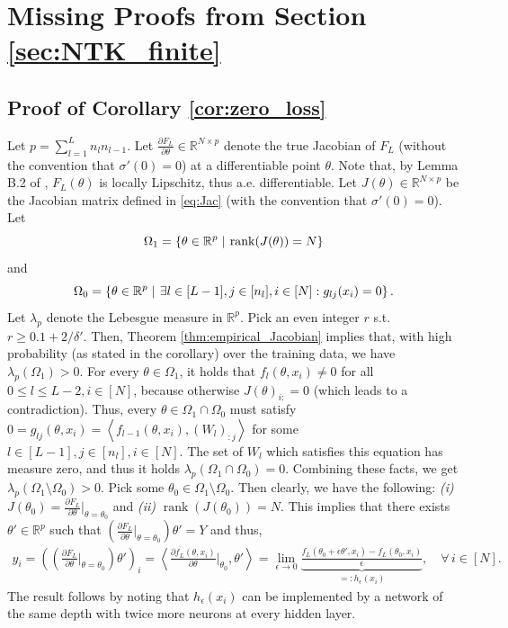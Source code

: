 \documentclass[11pt]{article}
\makeatletter
\def\RR{\mathbb{R}}
\def\rank{\operatorname{\mathop{rank}}}
\def\Set#1{\left\{ #1 \right\}}
\def\Bigbar#1{\mathrel{\left|\vphantom{#1}\right.}}%
\def\Setbar#1#2{\Set{#1 \Bigbar{#1 #2} #2}}
\newenvironment{proof}{\par\noindent{\bf Proof:\ }}{\hfill$\Box$\\[2mm]}
\newcommand{\inner}[1]{\left\langle#1\right\rangle}
\makeatother
\begin{document}
\section{Missing Proofs from Section \ref{sec:NTK_finite}}
\subsection{Proof of Corollary \ref{cor:zero_loss}}\label{app:zero_loss}
    Let $p=\sum_{l=1}^{L}n_ln_{l-1}$.
    Let $\frac{\partial F_L}{\partial\theta}\in\RR^{N\times p}$ denote the true Jacobian of $F_L$ (without the convention that $\sigma'(0)=0$) at a differentiable point $\theta.$
    Note that, by Lemma B.2 of \citep{QuynhMarco2020}, $F_L(\theta)$ is locally Lipschitz, thus a.e. differentiable.
    Let $J(\theta)\in\RR^{N\times p}$ be the Jacobian matrix defined in \eqref{eq:Jac} (with the convention that $\sigma'(0)=0$).
    Let $$\Omega_1=\Setbar{\theta\in\RR^p}{\rank(J(\theta))=N}$$ and $$\Omega_0=\Setbar{\theta\in\RR^p}{\exists l\in[L-1],j\in[n_l],i\in[N]: g_{lj}(x_i)=0} .$$ 
    Let $\lambda_p$ denote the Lebesgue measure in $\RR^p.$
    Pick an even integer $r$ s.t. $r\ge 0.1+2/\delta'$. Then, Theorem \ref{thm:empirical_Jacobian} implies that,
    with high probability (as stated in the corollary) over the training data, we have $\lambda_p(\Omega_1)>0.$ 
    For every $\theta\in\Omega_1$, it holds that $f_l(\theta,x_i)\neq 0$ for all $0\leq l\leq L-2,i\in[N]$,
    because otherwise $J(\theta)_{i:}=0$ (which leads to a contradiction).
    Thus, every $\theta\in\Omega_1\cap\Omega_0$ must satisfy $0=g_{lj}(\theta,x_i)=\inner{f_{l-1}(\theta,x_i), (W_l)_{:j}}$
    for some $l\in[L-1],j\in[n_l],i\in[N].$ 
    The set of $W_l$ which satisfies this equation has measure zero,
    and thus it holds $\lambda_p(\Omega_1\cap\Omega_0)=0.$
    Combining these facts, we get $\lambda_p(\Omega_1\setminus\Omega_0)>0.$
    Pick some $\theta_0\in\Omega_1\setminus\Omega_0.$
    Then clearly, we have the following:
    \emph{(i)} $J(\theta_0)=\frac{\partial F_L}{\partial\theta}\Big\vert_{\theta=\theta_0}$
    and \emph{(ii)} $\rank(J(\theta_0))=N.$ 
    This implies that there exists $\theta'\in\RR^p$ such that $\left(\frac{\partial F_L}{\partial\theta}\Big\vert_{\theta=\theta_0}\right)\theta'=Y$
    and thus,
    \begin{align*}
	y_i=
	\left(\left(\frac{\partial F_L}{\partial\theta}\Big\vert_{\theta=\theta_0}\right)\theta'\right)_{i}
	=\inner{\frac{\partial f_L(\theta,x_i)}{\partial\theta}\Big\vert_{\theta_0}, \theta'}
	=\lim_{\epsilon\to 0} \underbrace{\frac{f_L(\theta_0+\epsilon\theta',x_i)-f_L(\theta_0,x_i)}{\epsilon}}_{=:h_\epsilon(x_i)},\quad\forall\,i\in[N] .
    \end{align*}
    The result follows by noting that $h_\epsilon(x_i)$ can be implemented by a network of the same depth with twice more neurons at every hidden layer.
\end{document}
